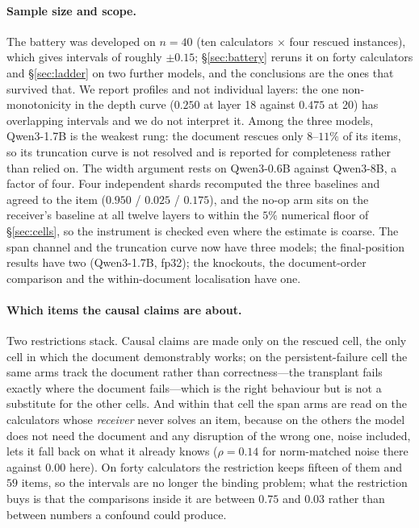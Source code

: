 \documentclass{article}
\begin{document}
\paragraph{Sample size and scope.} The battery was developed on $n=40$ (ten
calculators $\times$ four rescued instances), which gives intervals of roughly
$\pm 0.15$; \S\ref{sec:battery} reruns it on forty calculators and
\S\ref{sec:ladder} on two further models, and the conclusions are the ones that
survived that. We report profiles and not individual layers: the one
non-monotonicity in the depth curve ($0.250$ at layer 18 against $0.475$ at 20)
has overlapping intervals and we do not interpret it. Among the three models,
Qwen3-1.7B is the weakest rung: the document rescues only $8$--$11\%$ of its
items, so its truncation curve is not resolved and is reported for completeness
rather than relied on. The width argument rests on Qwen3-0.6B against Qwen3-8B,
a factor of four.
Four independent shards recomputed the three baselines and agreed to the item
($0.950$ / $0.025$ / $0.175$), and the no-op arm sits on the receiver's baseline
at all twelve layers to within the $5\%$ numerical floor of
\S\ref{sec:cells}, so the instrument is checked even where the estimate is
coarse. The span channel and the truncation curve now have three
models; the final-position results have two (Qwen3-1.7B, fp32); the knockouts,
the document-order comparison and the within-document localisation have one.

\paragraph{Which items the causal claims are about.} Two restrictions stack.
Causal claims are made only on the rescued cell, the only cell in which the
document demonstrably works; on the persistent-failure cell the same arms track
the document rather than correctness---the transplant fails exactly where the
document fails---which is the right behaviour but is not a substitute for the
other cells. And within that cell the span arms are read on the calculators
whose \emph{receiver} never solves an item, because on the others the model does
not need the document and any disruption of the wrong one, noise included, lets
it fall back on what it already knows ($\rho = 0.14$ for norm-matched noise
there against $0.00$ here). On forty calculators the restriction keeps fifteen of them and
$59$ items, so the intervals are no longer the binding problem; what the
restriction buys is that the comparisons inside it are between $0.75$ and
$0.03$ rather than between numbers a confound could produce.
\end{document}
